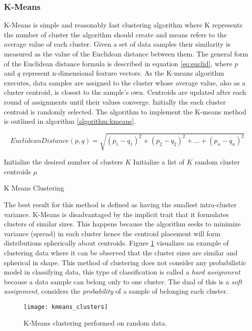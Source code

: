 \subsubsection{K-Means}
\label{subsubsection:kmeans}
K-Means is simple and reasonably fast clustering algorithm where K represents the number of cluster the algorithm should create and means refers to the average value of each cluster. Given a set of data samples their similarity is measured as the value of the Euclidean distance between them. The general form of the Euclidean distance formula is described in equation \ref{eq:euclid}, where $p$ and $q$ represent n-dimensional feature vectors. As the K-means algorithm executes, data samples are assigned to the cluster whose average value, also as a cluster centroid, is closest to the sample's own. Centroids are updated after each round of assignments until their values converge. Initially the each cluster centroid is randomly selected. The algorithm to implement the K-means method is outlined in algorithm \ref{algorithm:kmeans}.

\begin{equation}
    EuclideanDistance(p,q) = \sqrt{(p_1 - q_1)^2 + (p_2 - q_2)^2 +\hdots + (p_n - q_n)^2}
    \label{eq:euclid}
\end{equation} 

\begin{algorithm}
    \SetAlgoLined
    Initialize the desired number of clusters $K$\;
    Initialize a list of $K$ random cluster centroids $\mu$\;
    \caption{K Means Clustering \cite{oreilly_python}}
    \label{algorithm:kmeans}
\end{algorithm}

The best result for this method is defined as having the smallest intra-cluster variance. K-Means is disadvantaged by the implicit trait that it formulates clusters of similar sizes. This happens because the algorithm seeks to minimize variance (spread) in each cluster hence the  centroid placement will form distributions spherically about centroids. Figure \ref{fig:clusters} visualizes an example of clustering data where it can be observed that the cluster sizes are similar and spherical in shape. This method of clustering does not consider any probabilistic model in classifying data, this type of classification is called a \emph{hard assignment} because a data sample can belong only to one cluster. The dual of this is a \emph{soft assignment}, considers the \emph{probability} of a sample of belonging each cluster. 

\begin{figure}[H]
    \centering
    \centering\texttt{[image: kmeans\_clusters]}
    \caption{K-Means clustering performed on random data. \cite{matlab_clustering}}
    \label{fig:clusters}
\end{figure} 